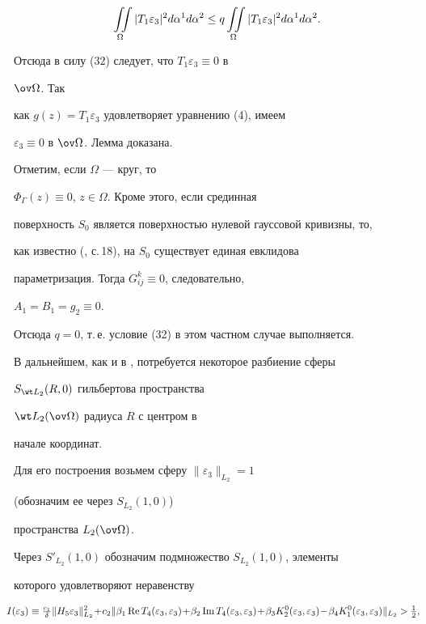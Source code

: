 $$ 


\intO|T_1\varepsilon_3|^2d\alpha^1d\alpha^2\le 


q\intO|T_1\varepsilon_3|^2d\alpha^1d\alpha^2. 


$$ 


Отсюда в силу (32) следует, что $T_1\varepsilon_3\equiv 0$ в 


$\ov\Omega$. Так 


как $g(z)=T_1\varepsilon_3$ удовлетворяет уравнению (4), имеем 


$\varepsilon_3\equiv 0$ в $\ov\Omega$. Лемма доказана. 


 


Отметим, если $\Omega$ --- круг, то 


$\Phi_\Gamma(z)\equiv 0$, $z\in\Omega$. Кроме этого, если срединная 


поверхность $S_0$ является поверхностью нулевой гауссовой кривизны, то, 


как известно (\cite{1}, с.\,18), на $S_0$ существует единая евклидова 


параметризация. Тогда $G^k_{ij}\equiv 0$, следовательно, 


$A_1=B_1=g_2\equiv 0$. 


Отсюда $q=0$, т.\,е. условие (32) в этом частном случае выполняется. 


 


В дальнейшем, как и в \cite{1}, потребуется некоторое разбиение сферы 


$S_{\wt L_2}(R,0)$ гильбертова пространства 


$\wt L_2(\ov\Omega)$ радиуса $R$ с центром в 


начале координат. 


Для его построения возьмем сферу $\|\varepsilon_3\|_{L_2}=1$ 


(обозначим ее через $S_{L_2}(1,0)$) 


пространства $L_2(\ov\Omega)$. 


Через $S'_{L_2}(1,0)$ обозначим подмножество $S_{L_2}(1,0)$, элементы 


которого удовлетворяют неравенству 


\begin{equation} 


\negthickspace\negthickspace\negthickspace


I(\varepsilon_3)\equiv\tfrac{c_1}{\delta} 


\|H_5\varepsilon_3\|^2_{L_2}\!+\!c_2\|\beta_1\re 


T_4(\varepsilon_3,\varepsilon_3)\!+\!\beta_2\im


T_4(\varepsilon_3,\varepsilon_3)\!+ \!


\beta_3 K^0_2(\varepsilon_3,\varepsilon_3)\!- \!


\beta_4K^0_1(\varepsilon_3,\varepsilon_3)\|_{L_2}> 


\tfrac{1}{2}, 


\end{equation} 


